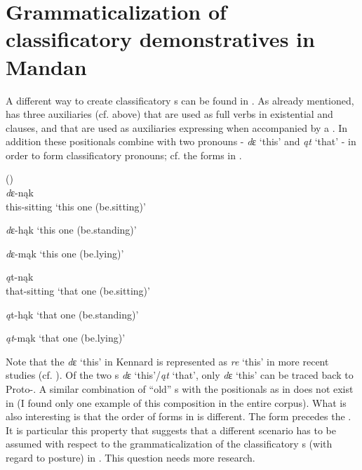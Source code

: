 \documentclass[output=paper]{langsci/langscibook}
\begin{document}
\section{Grammaticalization of classificatory demonstratives in Mandan}\label{sec:helmbrecht:5}


A different way to create classificatory s can be found in . As already mentioned,  has three  auxiliaries (cf.  above) that are used as full verbs in existential and  clauses, and that are used as auxiliaries expressing  when accompanied by a . In addition these positionals combine with two  pronouns - \textit{d}{ɛ} `this' and \textit{ąt} `that' - in order to form classificatory  pronouns; cf. the forms in . 

\ea \label{ex:helmbrecht:19}
 (\citealt[28f]{Kennard1936})\\
\textit{d}{ɛ}-{nąk}   \\
this-sitting
\glt `this one (be.sitting)'

\textit{d}{ɛ}-{hąk}  
\glt  `this one (be.standing)'

\textit{d}{ɛ}-{mąk}   
\glt `this one (be.lying)'

\textit{ą}{t}-{nąk}   \\
that-sitting
\glt `that one (be.sitting)'

\textit{ą}{t}-{hąk} 
\glt   `that one (be.standing)'

\textit{ąt}-{mąk}  
\glt  `that one (be.lying)'     
\z

Note that the  \textit{d}{ɛ} `this' in Kennard is represented as \textit{re} `this' in more recent studies (cf. \citealt[42]{Mixco1997}). Of the two s \textit{d}{ɛ} `this'\slash \textit{ąt} `that', only \textit{d}{ɛ} `this' can be traced back to Proto-. A similar combination of ``old'' s with the positionals as in  does not exist in  (I found only one example of this composition in the entire  corpus). What is also interesting is that the order of forms in  is different. The  form precedes the . It is particular this property that suggests that a different scenario has to be assumed with respect to the grammaticalization of the classificatory s (with regard to posture) in . This question needs more research.
\end{document}
